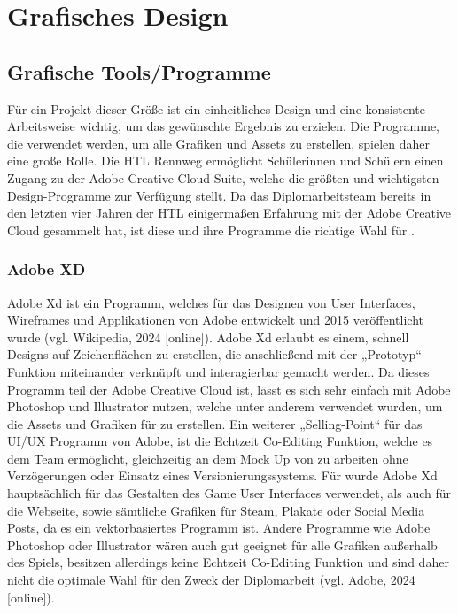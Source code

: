 
\chapter{Grafisches Design}\label{ch:grafikdesign}

\section{Grafische Tools/Programme}

Für ein Projekt dieser Größe
ist ein einheitliches Design und eine konsistente Arbeitsweise wichtig, um das gewünschte Ergebnis zu erzielen.
Die Programme, die verwendet werden, um alle Grafiken und Assets zu erstellen, spielen daher eine große Rolle.
Die HTL Rennweg ermöglicht Schülerinnen und Schülern einen Zugang zu der Adobe Creative Cloud Suite, welche die größten und wichtigsten Design-Programme zur Verfügung stellt. Da das Diplomarbeitsteam bereits in den letzten vier Jahren der HTL einigermaßen Erfahrung mit der Adobe Creative Cloud gesammelt hat, ist diese und ihre Programme die richtige Wahl für \FF.

\subsection{Adobe XD}

Adobe Xd ist ein Programm, welches für das Designen von User Interfaces, Wireframes und Applikationen von Adobe entwickelt und 2015 veröffentlicht wurde (vgl. Wikipedia, 2024 [online]). Adobe Xd erlaubt es einem, schnell Designs auf Zeichenflächen zu erstellen, die anschließend mit der „Prototyp“ Funktion miteinander verknüpft und interagierbar gemacht werden. Da dieses Programm teil der Adobe Creative Cloud ist, lässt es sich sehr einfach mit Adobe Photoshop und Illustrator nutzen, welche unter anderem verwendet wurden, um die Assets und Grafiken für \FF zu erstellen. Ein weiterer „Selling-Point“ für das UI/UX Programm von Adobe, ist die Echtzeit Co-Editing Funktion, welche es dem Team ermöglicht, gleichzeitig an dem Mock Up von \FF zu arbeiten ohne Verzögerungen oder Einsatz eines Versionierungssystems.
Für \FF wurde Adobe Xd hauptsächlich für das Gestalten des Game User Interfaces verwendet, als auch für die Webseite, sowie sämtliche Grafiken für Steam, Plakate oder Social Media Posts, da es ein vektorbasiertes Programm ist. Andere Programme wie Adobe Photoshop oder Illustrator wären auch gut geeignet für alle Grafiken außerhalb des Spiels, besitzen allerdings keine Echtzeit Co-Editing Funktion und sind daher nicht die optimale Wahl für den Zweck der Diplomarbeit (vgl. Adobe, 2024 [online]).

